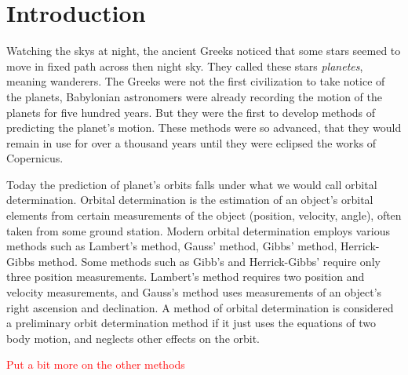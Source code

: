 \documentclass[12pt]{article}
\begin{document}
	\section{Introduction}

	Watching the skys at night, the ancient Greeks noticed that some stars seemed to move in fixed path across then night sky. They called these stars \textit{planetes}, meaning wanderers. The Greeks were not the first civilization to take notice of the planets, Babylonian astronomers were already recording the motion of the planets for five hundred years. But they were the first to develop methods of predicting the planet's motion. These methods were so advanced, that they would remain in use for over a thousand years until they were eclipsed the works of Copernicus\cite{lectureOnGreekAstro}. %
	
	Today the prediction of planet's orbits falls under what we would call orbital determination. Orbital determination is the estimation of an object's orbital elements from certain measurements of the object (position, velocity, angle), often taken from some ground station. Modern orbital determination employs various methods such as Lambert's method, Gauss' method, Gibbs' method, Herrick-Gibbs method. Some methods such as Gibb's and Herrick-Gibbs' require only three position measurements. Lambert's method requires two position and velocity measurements, and Gauss's method uses measurements of an object's right ascension and declination. A method of orbital determination is considered a preliminary orbit determination method if it just uses the equations of two body motion, and neglects other effects on the orbit. 
	
		\textcolor{red}{Put a bit more on the other methods}

	\newpage
\end{document}
